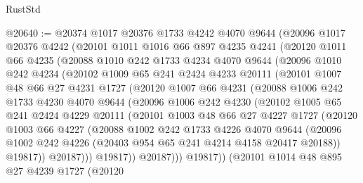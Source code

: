 \begin{lexlean}{RustStd}
\begin{coremodule}
@20640 := @20374
    @1017
    @20376
    @1733
    @4242
    @4070
    @9644
    (@20096
      @1017
      @20376
      @4242
      (@20101
        @1011
        @1016
        @66
        @897
        @4235
        @4241
        (@20120
          @1011
          @66
          @4235
          (@20088
            @1010
            @242
            @1733
            @4234
            @4070
            @9644
            (@20096
              @1010
              @242
              @4234
              (@20102
                @1009
                @65
                @241
                @2424
                @4233
                @20111
                (@20101
                  @1007
                  @48
                  @66
                  @27
                  @4231
                  @1727
                  (@20120
                    @1007
                    @66
                    @4231
                    (@20088
                      @1006
                      @242
                      @1733
                      @4230
                      @4070
                      @9644
                      (@20096
                        @1006
                        @242
                        @4230
                        (@20102
                          @1005
                          @65
                          @241
                          @2424
                          @4229
                          @20111
                          (@20101
                            @1003
                            @48
                            @66
                            @27
                            @4227
                            @1727
                            (@20120
                              @1003
                              @66
                              @4227
                              (@20088
                                @1002
                                @242
                                @1733
                                @4226
                                @4070
                                @9644
                                (@20096
                                  @1002
                                  @242
                                  @4226
                                  (@20403 @954 @65 @241 @4214 @4158 @20417 @20188))
                                @19817))
                            @20187)))
                      @19817))
                  @20187)))
            @19817))
        (@20101
          @1014
          @48
          @895
          @27
          @4239
          @1727
          (@20120

\end{coremodule}
\end{lexlean}
